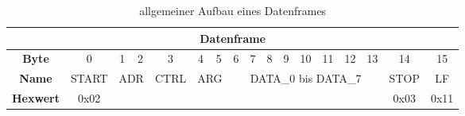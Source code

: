 \begin{table}[h]
    \centering
    \begin{tabular}{|c|c|c|c|c|c|c|c|c|c|c|c|c|c|c|c|c|}
    \hline
    \multicolumn{17}{|c|}{\textbf{Datenframe}}                                                                                                             \\ \hline
    \textbf{Byte}     & 0     & 1           & 2          & 3    & 4           & 5          & 6  & 7  & 8  & 9  & 10  & 11  & 12  & 13 & 14   & 15   \\ \hline
    \textbf{Name}            & START & \multicolumn{2}{c|}{ADR} & CTRL & \multicolumn{2}{c|}{ARG} & \multicolumn{8}{c|}{DATA\_0 bis DATA\_7} & STOP & LF   \\ \hline
    \textbf{Hexwert}    	 & 0x02  &             &            &      &             &            & \multicolumn{8}{c|}{}                    & 0x03 & 0x11 \\ \hline
    \end{tabular}
    \caption{allgemeiner Aufbau eines Datenframes}
\end{table}

